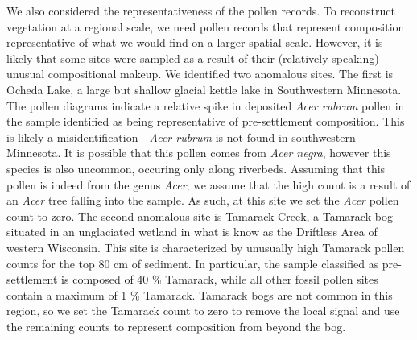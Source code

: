 \documentclass[12pt]{article}
\begin{document}
We also considered the representativeness of the pollen records. To
reconstruct vegetation at a regional scale, we need pollen records
that represent composition representative of what we would find on a
larger spatial scale. However, it is likely that some sites were
sampled as a result of their (relatively speaking) unusual
compositional makeup. We identified two anomalous sites. The first is
Ocheda Lake, a large but shallow glacial kettle lake in Southwestern
Minnesota. The pollen diagrams indicate a relative spike in deposited
\textit{Acer rubrum} pollen in the sample identified as being
representative of pre-settlement composition. This is likely a
misidentification - \textit{Acer rubrum} is not found in southwestern
Minnesota. It is possible that this pollen comes from \textit{Acer
  negra}, however this species is also uncommon, occuring only along
riverbeds. Assuming that this pollen is indeed from the genus
\textit{Acer}, we assume that the high count is a result of an
\textit{Acer} tree falling into the sample. As such, at this site we
set the \textit{Acer} pollen count to zero. The second anomalous site
is Tamarack Creek, a Tamarack bog situated in an unglaciated wetland
in what is know as the Driftless Area of western Wisconsin. This site
is characterized by unusually high Tamarack pollen counts for the top
80 cm of sediment. In particular, the sample classified as
pre-settlement is composed of 40 \% Tamarack, while all other fossil
pollen sites contain a maximum of 1 \% Tamarack. Tamarack bogs are not
common in this region, so we set the Tamarack count to zero to remove
the local signal and use the remaining counts to represent composition
from beyond the bog.

\end{document}
